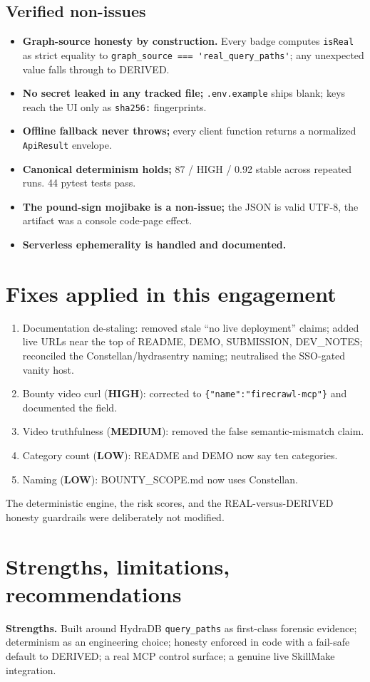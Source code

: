 \documentclass[11pt]{article}
\newcommand{\sevHIGH}{\textcolor{high}{\textbf{HIGH}}}
\newcommand{\sevMED}{\textcolor{med}{\textbf{MEDIUM}}}
\newcommand{\sevLOW}{\textcolor{low}{\textbf{LOW}}}
\newcommand{\code}[1]{\lstinline[style=inlinecode]|#1|}
\begin{document}
\subsection{Verified non-issues}
\begin{itemize}
\item \textbf{Graph-source honesty by construction.} Every badge computes \code{isReal} as strict equality to \code{graph_source === 'real_query_paths'}; any unexpected value falls through to DERIVED.
\item \textbf{No secret leaked in any tracked file;} \code{.env.example} ships blank; keys reach the UI only as \code{sha256:} fingerprints.
\item \textbf{Offline fallback never throws;} every client function returns a normalized \code{ApiResult} envelope.
\item \textbf{Canonical determinism holds;} 87 / HIGH / 0.92 stable across repeated runs. 44 pytest tests pass.
\item \textbf{The pound-sign mojibake is a non-issue;} the JSON is valid UTF-8, the artifact was a console code-page effect.
\item \textbf{Serverless ephemerality is handled and documented.}
\end{itemize}

\section{Fixes applied in this engagement}
\begin{enumerate}
\item Documentation de-staling: removed stale ``no live deployment'' claims; added live URLs near the top of README, DEMO, SUBMISSION, DEV_NOTES; reconciled the Constellan/hydrasentry naming; neutralised the SSO-gated vanity host.
\item Bounty video curl (\sevHIGH{}): corrected to \code{{"name":"firecrawl-mcp"}} and documented the field.
\item Video truthfulness (\sevMED{}): removed the false semantic-mismatch claim.
\item Category count (\sevLOW{}): README and DEMO now say ten categories.
\item Naming (\sevLOW{}): BOUNTY\_SCOPE.md now uses Constellan.
\end{enumerate}
The deterministic engine, the risk scores, and the REAL-versus-DERIVED honesty guardrails were deliberately not modified.

\section{Strengths, limitations, recommendations}
\textbf{Strengths.} Built around HydraDB \code{query_paths} as first-class forensic evidence; determinism as an engineering choice; honesty enforced in code with a fail-safe default to DERIVED; a real MCP control surface; a genuine live SkillMake integration.
\end{document}
